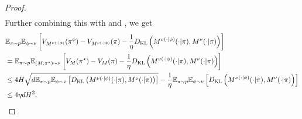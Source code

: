 \begin{proof}
\begin{align*}
\end{align*}
Further combining this with  and , we get 
\begin{align*}
    &\mathbb{E}_{\pi\sim p}  \mathbb{E}_{\phi\sim \nu}\left[ V_{M^{\nu(\cdot|\phi)}}(\pi^\phi) - V_{M^{\nu(\cdot|\phi)}}(\pi) - \frac{1}{\eta}D_{\textsc{KL}}\left(M^{\nu(\cdot|\phi)}(\cdot|\pi), M^{\nu}(\cdot|\pi)\right)\right] \\ 
    &=\mathbb{E}_{\pi\sim p}  \mathbb{E}_{(M,\pi^\star)\sim \nu}\left[ V_M(\pi^\star) - V_M(\pi) - \frac{1}{\eta}D_{\textsc{KL}}\left(M^{\nu(\cdot|\phi)}(\cdot|\pi), M^{\nu}(\cdot|\pi)\right)\right] \\ 
    &\leq 4H\sqrt{d \mathbb{E}_{\pi\sim p}\mathbb{E}_{\phi\sim \nu} 
 \left[D_{\textsc{KL}} \left(M^{\nu(\cdot|\phi)}(\cdot|\pi), M^{\nu}(\cdot|\pi)\right)\right]} - \frac{1}{\eta} \mathbb{E}_{\pi\sim p}\mathbb{E}_{\phi\sim \nu}\left[D_{\textsc{KL}} \left(M^{\nu(\cdot|\phi)}(\cdot|\pi), M^{\nu}(\cdot|\pi)\right)\right] \\
 &\leq 4\eta dH^2. 
 \end{align*}


\end{proof}
